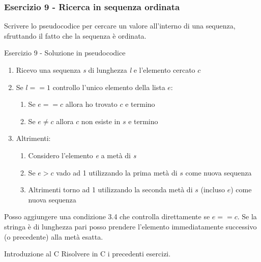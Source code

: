 \documentclass[]{beamer}
\begin{document}
\begin{frame}
\frametitle{Esercizio 9 - Ricerca in sequenza ordinata}
Scrivere lo pseudocodice per cercare un valore all'interno di una sequenza, sfruttando il fatto che la sequenza è ordinata.
\end{frame}

\begin{frame}{Esercizio 9 - Soluzione in pseudocodice}
\begin{enumerate}
	\item Ricevo una sequenza \emph{s} di lunghezza \emph{l} e l'elemento cercato $c$
	\item Se $l == 1$ controllo l'unico elemento della lista $e$:
	\begin{enumerate}
		\item Se $e==c$ allora ho trovato $c$ e termino
		\item Se $e\neq c$ allora $c$ non esiste in $s$ e termino
	\end{enumerate}
	\item Altrimenti:
	\begin{enumerate}
		\item Considero l'elemento \emph{e} a metà di \emph{s}
		\item Se $e > c$ vado ad 1 utilizzando la prima metà di $s$ come nuova sequenza
		\item Altrimenti torno ad 1 utilizzando la seconda metà di $s$ (incluso $e$) come nuova sequenza
	\end{enumerate}
\end{enumerate}
Posso aggiungere una condizione 3.4 che controlla direttamente se $e == c$.
Se la stringa è di lunghezza pari posso prendere l'elemento immediatamente successivo (o precedente) alla metà esatta.
\end{frame}

\begin{frame}{Introduzione al C}
Risolvere in C i precedenti esercizi.
\end{frame}
\end{document}
